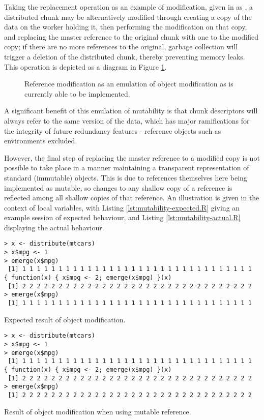 Taking the replacement operation as an example of modification, given in \R{} as \code{\$<-}, a distributed chunk may be alternatively modified through creating a copy of the data on the worker holding it, then performing the modification on that copy, and replacing the master reference to the original chunk with one to the modified copy; if there are no more references to the original, garbage collection will trigger a deletion of the distributed chunk, thereby preventing memory leaks.
This operation is depicted as a diagram in Figure \cref{fig:modifyref}.

\begin{figure}

\caption{Reference modification as an emulation of object modification as is currently able to be implemented.}
\label{fig:modifyref}
\end{figure}

A significant benefit of this emulation of mutability is that chunk descriptors will always refer to the same version of the data, which has major ramifications for the integrity of future redundancy features - reference objects such as environments excluded.

However, the final step of replacing the master reference to a modified copy is not possible to take place in a manner maintaining a transparent representation of standard (immutable) \R{} objects.
This is due to references themselves here being implemented as mutable, so changes to any shallow copy of a reference is reflected among all shallow copies of that reference.
An illustration is given in the context of local variables, with Listing \cref{lst:mutability-expected.R} giving an example \R{} session of expected behaviour, and Listing \cref{lst:mutability-actual.R} displaying the actual behaviour.

\begin{listing}
\begin{verbatim}
> x <- distribute(mtcars)
> x$mpg <- 1
> emerge(x$mpg)
 [1] 1 1 1 1 1 1 1 1 1 1 1 1 1 1 1 1 1 1 1 1 1 1 1 1 1 1 1 1 1 1 1 1
{ function(x) { x$mpg <- 2; emerge(x$mpg) }(x)
 [1] 2 2 2 2 2 2 2 2 2 2 2 2 2 2 2 2 2 2 2 2 2 2 2 2 2 2 2 2 2 2 2 2
> emerge(x$mpg)
 [1] 1 1 1 1 1 1 1 1 1 1 1 1 1 1 1 1 1 1 1 1 1 1 1 1 1 1 1 1 1 1 1 1
\end{verbatim}
\caption{Expected result of object modification.}
\label{lst:mutability-expected.R}
\end{listing}

\begin{listing}
\begin{verbatim}
> x <- distribute(mtcars)
> x$mpg <- 1
> emerge(x$mpg)
 [1] 1 1 1 1 1 1 1 1 1 1 1 1 1 1 1 1 1 1 1 1 1 1 1 1 1 1 1 1 1 1 1 1
{ function(x) { x$mpg <- 2; emerge(x$mpg) }(x)
 [1] 2 2 2 2 2 2 2 2 2 2 2 2 2 2 2 2 2 2 2 2 2 2 2 2 2 2 2 2 2 2 2 2
> emerge(x$mpg)
 [1] 2 2 2 2 2 2 2 2 2 2 2 2 2 2 2 2 2 2 2 2 2 2 2 2 2 2 2 2 2 2 2 2
\end{verbatim}
\caption{Result of object modification when using mutable reference.}
\label{lst:mutability-actual.R}
\end{listing}


